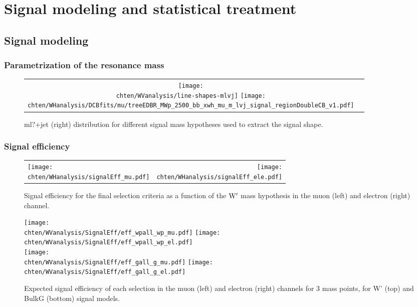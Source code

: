\chapter{Signal modeling and statistical treatment}
\label{ch:sigModel}

\section{Signal modeling}
 \subsection{Parametrization of the resonance mass}

 \begin{figure}[htbp]
 \centering
 \begin{tabular}{cc}
 \texttt{[image: \\chten/WVanalysis/line-shapes-mlvj]}
 \texttt{[image: \\chten/WHanalysis/DCBfits/mu/treeEDBR\_MWp\_2500\_bb\_xwh\_mu\_m\_lvj\_signal\_regionDoubleCB\_v1.pdf]} 
 \end{tabular}
 \caption{ml?+jet (right) distribution for different signal mass hypotheses used to extract the signal shape.}
 \label{fig:signalModel}
 \end{figure} 

\subsection{Signal efficiency}

\begin{figure}[htb]
\centering
\begin{tabular}{lr}
\texttt{[image: \\chten/WHanalysis/signalEff\_mu.pdf]} &
\texttt{[image: \\chten/WHanalysis/signalEff\_ele.pdf]} \\
\end{tabular}
\caption{Signal efficiency for the final selection criteria as a function of the $\mathrm{W}^\prime$ mass hypothesis in the muon (left) and electron (right) channel.}
\label{fig:signalEff}
\end{figure}

\begin{figure}[htbp]
\centering
\texttt{[image: \\chten/WVanalysis/SignalEff/eff\_wpall\_wp\_mu.pdf]}%
\texttt{[image: \\chten/WVanalysis/SignalEff/eff\_wpall\_wp\_el.pdf]}\\
\texttt{[image: \\chten/WVanalysis/SignalEff/eff\_gall\_g\_mu.pdf]}
\texttt{[image: \\chten/WVanalysis/SignalEff/eff\_gall\_g\_el.pdf]}\\
\caption{Expected signal efficiency of each selection in the muon (left) and electron (right) channels
for 3 mass points, for W' (top) and BulkG (bottom) signal models.}
\label{fig:sigcutflow}
\end{figure}


